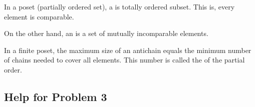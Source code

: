 \documentclass[12pt]{memoir}
\begin{document}
\begin{nonum-Def}
    In a poset (partially ordered set), a  is totally ordered subset. This is, every element is comparable.\par
    On the other hand, an  is a set of mutually incomparable elements.
\end{nonum-Def}

\begin{nonum-Th}[Dilworth]
In a finite poset, the maximum size of an antichain equals the minimum number of chains needed to cover all elements. This number is called the  of the partial order.
\end{nonum-Th}

\subsection*{Help for Problem 3}
\end{document}
